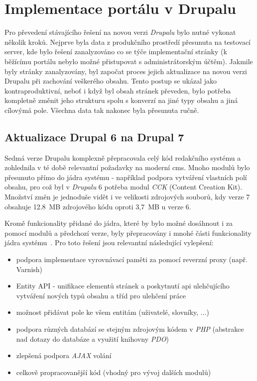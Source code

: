 \chapter{Implementace portálu v Drupalu}
\label{chap:implementace-drupal}

Pro převedení stávajícího řešení na novou verzi \emph{Drupalu} bylo nutné vykonat několik kroků. Nejprve byla data z produkčního prostředí přesunuta na testovací server, kde bylo řešení zanalyzováno co se týče implementační stránky (k běžícímu portálu nebylo možné přistupovat s administrátorským účtěm). Jakmile byly stránky zanalyzovány, byl započat proces jejich aktualizace na novou verzi Drupalu při zachování veškerého obsahu. Tento postup se ukázal jako kontraproduktivní, neboť i když byl obsah stránek převeden, bylo potřeba kompletně změnit jeho strukturu spolu s konverzí na jiné typy obsahu a jiná cílovýmá pole. Všechna data tak nakonec byla přesunuta ručně.

\section{Aktualizace Drupal 6 na Drupal 7}
\label{sec:aktualizace}
Sedmá verze Drupalu komplexně přepracovala celý kód redakčního systému a zohlednila v té době relevantní požadavky na moderní \gls{cms}. Mnoho modulů bylo přesunuto přímo do jádra systému - například podpora vytváření vlastních polí obsahu, pro což byl v \emph{Drupalu} 6 potřeba modul \emph{CCK} (Content Creation Kit). Množství změn je jednoduše vidět i ve velikosti zdrojových souborů, kdy verze 7 obsahuje 12.8~MB zdrojového kódu oproti 3,7~MB u verze 6.

Kromě funkcionality přidané do jádra, které by bylo možné dosáhnout i za pomocí modulů a předchozí verze, byly přepracovány i mnohé části funkcionality jádra systému~\cite{website:drupal-comparison}. Pro toto řešení jsou relevantní následující vylepšení:

\begin{itemize}
  \item podpora implementace vyrovnávací paměti za pomocí reverzní proxy (např. Varnish)
  \item Entity API - unifikace elementů stránek a poskytnutí \gls{api} ulehčujícího vytváření nových typů obsahu a tříd pro ulehčení práce~\cite{drupal-entities}
  \item možnost přidávat pole ke všem entitám (uživatelé, slovníky, ...)
  \item podpora různých databází se stejným zdrojovým kódem v \emph{PHP} (abstrakce nad dotazy do databáze a využití knihovny \emph{PDO})
  \item zlepšená podpora \emph{AJAX} volání
  \item celkově propracovanější kód (vhodný pro vývoj dalších modulů)
\end{itemize}

